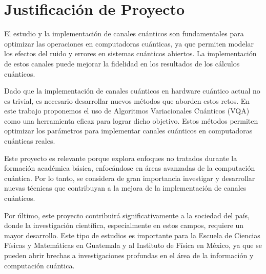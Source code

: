\section{Justificación de Proyecto}
El estudio y la implementación de canales cuánticos son fundamentales para optimizar las operaciones en computadoras cuánticas, ya que permiten modelar los efectos del ruido y errores en sistemas cuánticos abiertos. La implementación de estos canales puede mejorar la fidelidad en los resultados de los cálculos cuánticos.

Dado que la implementación de canales cuánticos en hardware cuántico actual no es trivial, es necesario desarrollar nuevos métodos que aborden estos retos. En este trabajo proponemos el uso de Algoritmos Variacionales Cuánticos (VQA) como una herramienta eficaz para lograr dicho objetivo. Estos métodos permiten optimizar los parámetros para implementar canales cuánticos en computadoras cuánticas reales.

Este proyecto es relevante porque explora enfoques no tratados durante la formación académica básica, enfocándose en áreas avanzadas de la computación cuántica. Por lo tanto, se considera de gran importancia investigar y desarrollar nuevas técnicas que contribuyan a la mejora de la implementación de canales cuánticos. 

Por último, este proyecto contribuirá significativamente a la sociedad del país, donde la investigación científica, especialmente en estos campos, requiere un mayor desarrollo. Este tipo de estudios es importante para la Escuela de Ciencias Físicas y Matemáticas en Guatemala y al Instituto de Física en México, ya que se pueden abrir brechas a investigaciones profundas en el área de la información y computación cuántica.
